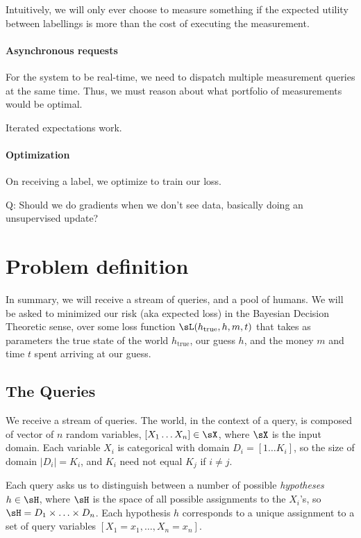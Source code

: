 Intuitively, we will only ever choose to measure something if the expected utility between labellings is more than the cost of executing the measurement.

\paragraph{Asynchronous requests}

For the system to be real-time, we need to dispatch multiple measurement queries at the same time. Thus, we must reason about what portfolio of measurements would be optimal.

Iterated expectations work.

\paragraph{Optimization}

On receiving a label, we optimize to train our loss.

Q: Should we do gradients when we don't see data, basically doing an unsupervised update?

\section{Problem definition}

In summary, we will receive a stream of queries, and a pool of humans.
 We will be asked to minimized our risk (aka expected loss) in the Bayesian Decision Theoretic sense, over some loss function $\sL(h_{\text{true}}, h, m, t)$ that takes as parameters the true state of the world $h_{\text{true}}$, our guess $h$, and the money $m$ and time $t$ spent arriving at our guess.  

\subsection{The Queries}

We receive a stream of queries.
 The world, in the context of a query, is composed of vector of $n$ random variables, $[X_1 \ldots X_n] \in \sX$, where $\sX$ is the input domain.
 Each variable $X_i$ is categorical with domain $D_i = [1 \ldots K_i]$, so the size of domain $|D_i| = K_i$, and $K_i$ need not equal $K_j$ if $i \neq j$.

Each query asks us to distinguish between a number of possible \textit{hypotheses} $h \in \sH$, where $\sH$ is the space of all possible assignments to the $X_i$'s, so $\sH = D_1 \times \ldots \times D_n$.
 Each hypothesis $h$ corresponds to a unique assignment to a set of query variables $[X_1 = x_1, \ldots, X_n = x_n]$. 

